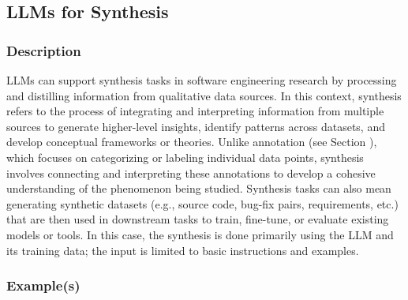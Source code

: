 \subsection{LLMs for Synthesis}
\label{sec:llms-for-synthesis}

\subsubsection{Description}

LLMs can support synthesis tasks in software engineering research by processing and distilling information from qualitative data sources.
In this context, synthesis refers to the process of integrating and interpreting information from multiple sources to generate higher-level insights, identify patterns across datasets, and develop conceptual frameworks or theories.
Unlike annotation (see Section \annotators), which focuses on categorizing or labeling individual data points, synthesis involves connecting and interpreting these annotations to develop a cohesive understanding of the phenomenon being studied.
Synthesis tasks can also mean generating synthetic datasets (e.g., source code, bug-fix pairs, requirements, etc.) that are then used in downstream tasks to train, fine-tune, or evaluate existing models or tools.
In this case, the synthesis is done primarily using the LLM and its training data; the input is limited to basic instructions and examples.

\subsubsection{Example(s)} 


